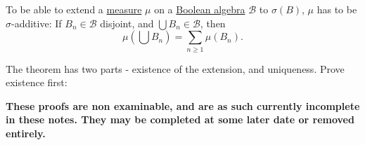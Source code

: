 \documentclass{article}
\newcommand{\1}[1]{\mathbbm{1}_{#1}}
\begin{document}

\begin{remark}
    To be able to extend a \hyperlink{def:measure}{measure} $\mu$ on a \hyperlink{def:boolAlg}{Boolean algebra} $\mathcal{B}$ to $\sigma(B)$, $\mu$ has to be $\sigma$-additive:
    If $B_n \in \mathcal{B}$ disjoint, and $\bigcup B_n \in \mathcal{B}$, then
    \begin{equation*}
        \mu\left(\bigcup B_n\right) = \sum_{n \geq 1} \mu(B_n).
    \end{equation*}
\end{remark}



The theorem has two parts - existence of the extension, and uniqueness.  Prove existence first:

\textbf{These proofs are non examinable, and are as such currently incomplete in these notes. They may be completed at some later date or removed entirely.}
\end{document}
